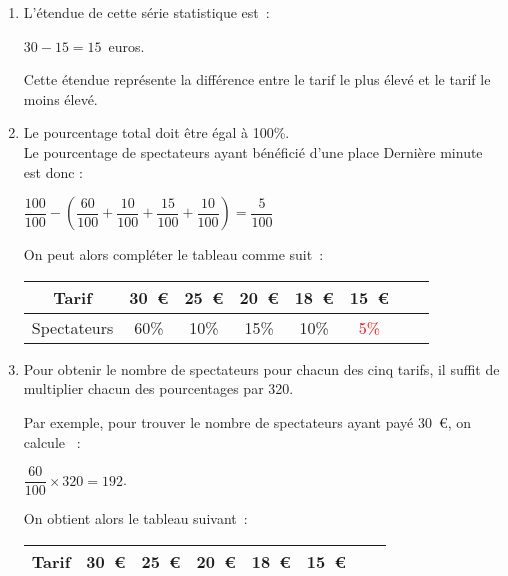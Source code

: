 \begin{corrige}
     \begin{enumerate}
          \item %
          L'étendue de cette série statistique est~:
          \begin{center}
               $30-15=15$~euros.
          \end{center}
          Cette étendue représente la différence entre le tarif le plus élevé et le tarif le moins élevé.
          \item %
          Le pourcentage total doit être égal à 100\%. \\
          Le pourcentage de spectateurs ayant bénéficié d'une place \og Dernière minute  \fg{} est donc :
          \begin{center}
               $\dfrac{100}{100}- $\nosp$\left(\dfrac{60}{100}+\dfrac{10}{100}+\dfrac{15}{100}+\dfrac{10}{100}\right)$\nosp$=\dfrac{5}{100}$
          \end{center}
          On peut alors compléter le tableau comme suit~:
          \begin{center}
               \begin{tabular}{|c|c|c|c|c|c|c|c|} %
                    \hline
                    Tarif   &  30~€  &  25~€ &  20~€  &  18~€  &  15~€
                    \\ \hline
                    Spectateurs       & 60\%   &  10\%    & 15\%    &  10\%  &     \textcolor{red}{5\%}
                    \\ \hline
               \end{tabular}
          \end{center}
          \item %
          Pour obtenir le nombre de spectateurs pour chacun des cinq tarifs, il suffit de multiplier chacun des pourcentages par 320.
          \par
          Par exemple, pour trouver le nombre de spectateurs ayant payé 30~€, on calcule ~:
          \begin{center}
               $\dfrac{60}{100} \times 320 = 192$.
          \end{center}
          On obtient alors le tableau suivant~:
          \begin{center}
               \begin{tabular}{|c|c|c|c|c|c|c|c|} %
                    \hline
                    Tarif   &  30~€  &  25~€ &  20~€  &  18~€  &  15~€
                    \\ \hline

\end{tabular}
\end{center}
\end{enumerate}
\end{corrige}
